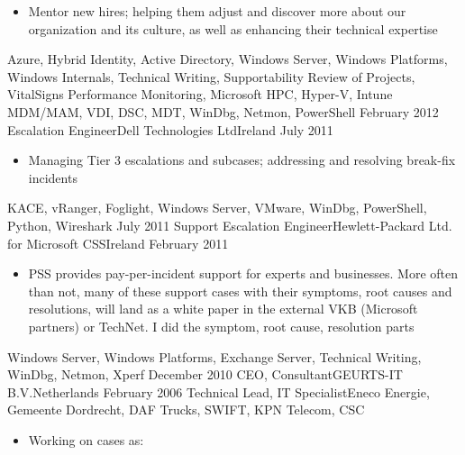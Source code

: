 \begin{experiences}
{\begin{itemize}
                        \item Mentor new hires; helping them adjust and discover more about our organization and its culture, as well as enhancing their technical expertise
                      \end{itemize}
                    }
                    {Azure, Hybrid Identity, Active Directory, Windows Server, Windows Platforms, Windows Internals, Technical Writing, Supportability Review of Projects, VitalSigns Performance Monitoring, Microsoft HPC, Hyper-V, Intune MDM/MAM, VDI, DSC, MDT, WinDbg, Netmon, PowerShell}
  \emptySeparator
  \experience
  {February 2012}   {Escalation Engineer}{Dell Technologies Ltd}{Ireland}
  {July 2011}       {
                      \begin{itemize}
                        \item Managing Tier 3 escalations and subcases; addressing and resolving break-fix incidents                                
                      \end{itemize}
                    }
                    {KACE, vRanger, Foglight, Windows Server, VMware, WinDbg, PowerShell, Python, Wireshark}
  \emptySeparator
  \experience
  {July 2011}       {Support Escalation Engineer}{Hewlett-Packard Ltd. for Microsoft CSS}{Ireland}
  {February 2011}   {                    
                      \begin{itemize}
                        \item PSS provides pay-per-incident support for experts and businesses. More often than not, many of these support cases with their symptoms, root causes and resolutions, will land as a white paper in the external VKB (Microsoft partners) or TechNet. I did the symptom, root cause, resolution parts                                        
                      \end{itemize}
                    }
                    {Windows Server, Windows Platforms, Exchange Server, Technical Writing, WinDbg, Netmon, Xperf}
  \emptySeparator   
  \consultantexperience
  {December 2010}   {CEO, Consultant}{GEURTS-IT B.V.}{Netherlands}
  {February 2006}   {Technical Lead, IT Specialist}{Eneco Energie, Gemeente Dordrecht, DAF Trucks, SWIFT, KPN Telecom, CSC}
                    {
                      \begin{itemize}
                        \item Working on cases as:
                        

\end{itemize}}
\end{experiences}
